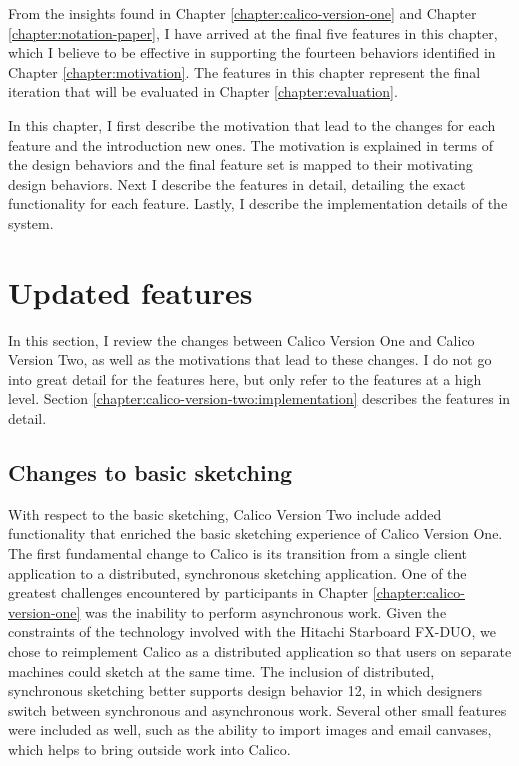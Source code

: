 From the insights found in Chapter \ref{chapter:calico-version-one} and Chapter \ref{chapter:notation-paper}, I have arrived at the final five features in this chapter, which I believe to be effective in supporting the fourteen behaviors identified in Chapter \ref{chapter:motivation}. The features in this chapter represent the final iteration that will be evaluated in Chapter \ref{chapter:evaluation}.

In this chapter, I first describe the motivation that lead to the changes for each feature and the introduction new ones. The motivation is explained in terms of the design behaviors and the final feature set is mapped to their motivating design behaviors. Next I describe the features in detail, detailing the exact functionality for each feature. Lastly, I describe the implementation details of the system.

\section{Updated features}
\label{chapter:calico-version-two:features}

In this section, I review the changes between Calico Version One and Calico Version Two, as well as the motivations that lead to these changes. I do not go into great detail for the features here, but only refer to the features at a high level. Section \ref{chapter:calico-version-two:implementation} describes the features in detail.

\subsection{Changes to basic sketching}

With respect to the basic sketching, Calico Version Two include added functionality that enriched the basic sketching experience of Calico Version One. The first fundamental change to Calico is its transition from a single client application to a distributed, synchronous sketching application. One of the greatest challenges encountered by participants in Chapter \ref{chapter:calico-version-one} was the inability to perform asynchronous work. Given the constraints of the technology involved with the Hitachi Starboard FX-DUO, we chose to reimplement Calico as a distributed application so that users on separate machines could sketch at the same time. The inclusion of distributed, synchronous sketching better supports design behavior 12, in which designers switch between synchronous and asynchronous work. Several other small features were included as well, such as the ability to import images and email canvases, which helps to bring outside work into Calico.

